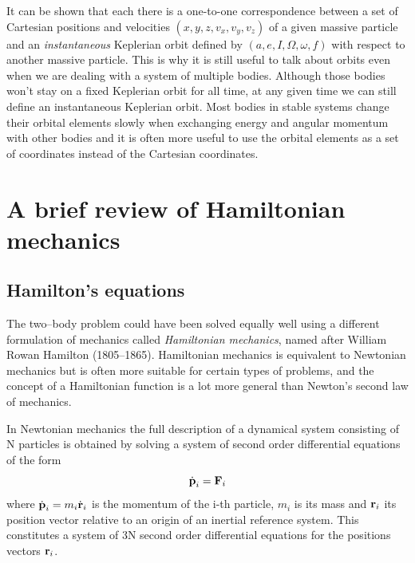 \documentclass[twoside,openright,titlepage,numbers=noenddot,headinclude,%
                footinclude=true,cleardoublepage=empty,abstractoff, 
                BCOR=5mm,paper=a4,fontsize=11pt,%
                american,%
                ]{scrreprt}%
\begin{document}
It can be shown that each there is a one-to-one correspondence between 
a set of Cartesian positions and velocities $(x,y,z,v_x,v_y,v_z)$ 
of a given massive particle and an \emph{instantaneous} Keplerian orbit 
defined by $(a,e,I,\Omega,\omega,f)$ with respect to another massive
particle. This is why it is still useful to talk about orbits even
when we are dealing with a system of multiple bodies. Although those
bodies won't stay on a fixed Keplerian orbit for all time, at any given
time we can still define an instantaneous Keplerian orbit.
Most bodies in stable systems change their orbital elements slowly
when exchanging energy and angular momentum with other bodies and
it is often more useful to use the orbital elements as a set of coordinates
instead of the Cartesian coordinates.

\section{A brief review of Hamiltonian mechanics}
\label{sec:hamiltonian_mechanics}
\subsection{Hamilton's equations}
\label{sub:Hamilton's equations}
The two--body problem could have been solved equally well using a different
formulation of mechanics called \emph{Hamiltonian mechanics}, named after
William Rowan Hamilton (1805--1865). Hamiltonian
mechanics is equivalent to Newtonian mechanics but is often more suitable
for certain types of problems, and the concept of a Hamiltonian function
is a lot more general than Newton's second law of mechanics.

In Newtonian mechanics the full description of a dynamical system 
consisting of N particles is 
obtained by solving a system of second order differential equations
of the form
\begin{equation}
    \dot{\boldsymbol{\mathbf{p}}}_i=\boldsymbol{\mathbf{F}}_i
\end{equation}
where $\dot{\boldsymbol{\mathbf{p}}}_i=m_i\dot{\boldsymbol{\mathbf{r}}}_i$ is the momentum of the
i-th particle, $m_i$ is its mass and $\boldsymbol{\mathbf{r}}_i$ its position vector
relative to an origin of an inertial reference system. This 
constitutes a system of 3N second order differential equations for
the positions vectors $\boldsymbol{\mathbf{r}}_i$.
\end{document}
